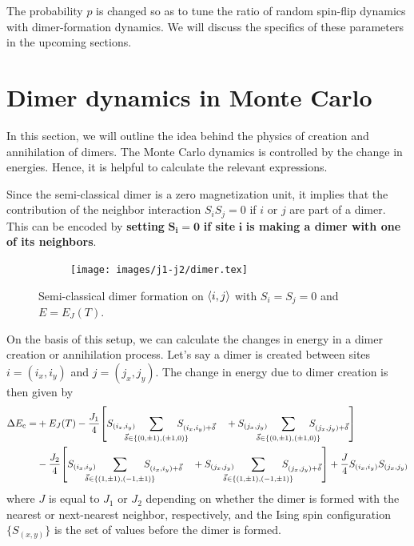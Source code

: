 \documentclass[../thesis_main.tex]{subfiles}
\begin{document}
The probability $p$ is changed so as to tune the ratio of random spin-flip dynamics with dimer-formation dynamics. We will discuss the specifics of these parameters in the upcoming sections.

\section{Dimer dynamics in Monte Carlo} %
In this section, we will outline the idea behind the physics of creation and annihilation of dimers. The Monte Carlo dynamics is controlled by the change in energies. Hence, it is helpful to calculate the relevant expressions. 

Since the semi-classical dimer is a zero magnetization unit, it implies that the contribution of the neighbor interaction $S_i S_j = 0$ if $i$ or $j$ are part of a dimer. This can be encoded by \textbf{setting} $\boldsymbol{S_i = 0}$ \textbf{if site} $\boldsymbol{i}$ \textbf{is making a dimer with one of its neighbors}.
\begin{figure}[t!]
    \centering
    \begin{subfigure}[b]{0.8\textwidth}  %
        \centering
        \texttt{[image: images/j1-j2/dimer.tex]}
    \end{subfigure}
    \caption{Semi-classical dimer formation on $\expval{i, j}$  with $S_i = S_j = 0$ and $E = E_J(T)$.}
    \label{}
\end{figure}
\FloatBarrier \!\!\!\!\!\!\!\!\!\!\!
On the basis of this setup, we can calculate the changes in energy in a dimer creation or annihilation process. Let's say a dimer is created between sites $i = (i_x, i_y)$ and $j = (j_x, j_y)$. The change in energy due to dimer creation is then given by
\begin{align*}
    \Delta E_\text{c} =  & + E_J(T) -\frac{J_1}{4} \qty[S_{(i_x, i_y)} \!\!\!\!\!\!\!\! \sum_{\vec{\delta} \in \{(0,\pm 1), (\pm 1, 0) \}} \!\!\!\!\!\!\!\! S_{(i_x, i_y) + \vec{\delta}} \quad + S_{(j_x, j_y)} \!\!\!\!\!\!\!\! \sum_{\vec{\delta} \in \{(0,\pm 1), (\pm 1, 0) \}} \!\!\!\!\!\!\!\! S_{(j_x, j_y) + \vec{\delta}}] \\
    & -\frac{J_2}{4} \qty[S_{(i_x, i_y)} \!\!\!\!\!\!\!\! \sum_{\vec{\delta} \in \{(1,\pm 1), (-1,\pm 1) \}} \!\!\!\!\!\!\!\! S_{(i_x, i_y) + \vec{\delta}} \quad + S_{(j_x, j_y)} \!\!\!\!\!\!\!\! \sum_{\vec{\delta} \in \{(1,\pm 1), (-1,\pm 1) \}} \!\!\!\!\!\!\!\! S_{(j_x, j_y) + \vec{\delta}}] + \frac{J}{4} S_{(i_x, i_y)} S_{(j_x, j_y)}
\end{align*}
where $J$ is equal to $J_1$ or $J_2$ depending on whether the dimer is formed with the nearest or next-nearest neighbor, respectively, and the Ising spin configuration $\{S_{(x,y)}\}$ is the set of values before the dimer is formed.
\end{document}
